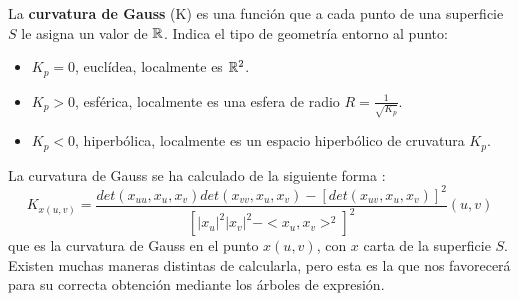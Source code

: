 \begin{definicion} La \textbf{curvatura de Gauss} (K) es una función que a cada punto de una superficie $S$ le asigna un valor de $\mathbb{R}$. Indica el tipo de geometría entorno al punto:
	\begin{itemize}
		\item $K_p = 0$, euclídea, localmente es $\mathbb{R}^2$.
		\item $K_p > 0$, esférica, localmente es una esfera de radio $R = \frac{1}{\sqrt{K_p}}$.
		\item $K_p < 0$, hiperbólica, localmente es un espacio hiperbólico de cruvatura $K_p$.
	\end{itemize}
La curvatura de Gauss se ha calculado de la siguiente forma \cite{Wolfram}:
		$$K_{x(u,v)} = \frac{det(x_{uu}, x_u, x_v) det(x_{vv}, x_u, x_v) - [det(x_{uv}, x_u, x_v)]^2} {[|x_u|^2|x_v|^2 - <x_u, x_v>^2]^2} (u, v)$$
	que es la curvatura de Gauss en el punto $x(u, v)$, con $x$ carta de la superficie $S$. Existen muchas maneras distintas de calcularla, pero esta es la que nos favorecerá para su correcta obtención mediante los árboles de expresión.
\end{definicion}

\endinput
